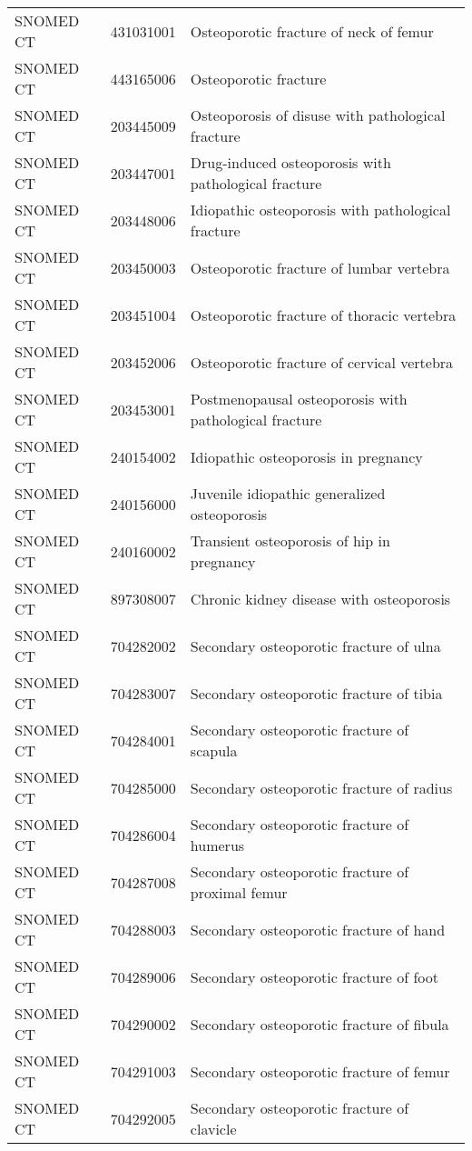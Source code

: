 \begin{longtable}{p{}p{}p{}}
  SNOMED CT & 431031001 & Osteoporotic fracture of neck of femur \\ 
  SNOMED CT & 443165006 & Osteoporotic fracture \\ 
  SNOMED CT & 203445009 & Osteoporosis of disuse with pathological fracture \\ 
  SNOMED CT & 203447001 & Drug-induced osteoporosis with pathological fracture \\ 
  SNOMED CT & 203448006 & Idiopathic osteoporosis with pathological fracture \\ 
  SNOMED CT & 203450003 & Osteoporotic fracture of lumbar vertebra \\ 
  SNOMED CT & 203451004 & Osteoporotic fracture of thoracic vertebra \\ 
  SNOMED CT & 203452006 & Osteoporotic fracture of cervical vertebra \\ 
  SNOMED CT & 203453001 & Postmenopausal osteoporosis with pathological fracture \\ 
  SNOMED CT & 240154002 & Idiopathic osteoporosis in pregnancy \\ 
  SNOMED CT & 240156000 & Juvenile idiopathic generalized osteoporosis \\ 
  SNOMED CT & 240160002 & Transient osteoporosis of hip in pregnancy \\ 
  SNOMED CT & 897308007 & Chronic kidney disease with osteoporosis \\ 
  SNOMED CT & 704282002 & Secondary osteoporotic fracture of ulna \\ 
  SNOMED CT & 704283007 & Secondary osteoporotic fracture of tibia \\ 
  SNOMED CT & 704284001 & Secondary osteoporotic fracture of scapula \\ 
  SNOMED CT & 704285000 & Secondary osteoporotic fracture of radius \\ 
  SNOMED CT & 704286004 & Secondary osteoporotic fracture of humerus \\ 
  SNOMED CT & 704287008 & Secondary osteoporotic fracture of proximal femur \\ 
  SNOMED CT & 704288003 & Secondary osteoporotic fracture of hand \\ 
  SNOMED CT & 704289006 & Secondary osteoporotic fracture of foot \\ 
  SNOMED CT & 704290002 & Secondary osteoporotic fracture of fibula \\ 
  SNOMED CT & 704291003 & Secondary osteoporotic fracture of femur \\ 
  SNOMED CT & 704292005 & Secondary osteoporotic fracture of clavicle \\ 

\end{longtable}
